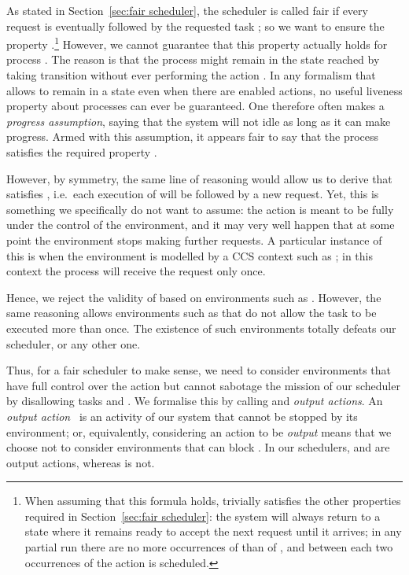 \documentclass[smallcondensed]{svjour3}
\newcommand{\Sect}[1]{Section~\ref{sec:#1}}
\newcounter {part}
\begin{document}
As stated in Section~\ref{sec:fair scheduler}, the scheduler is called fair if 
every request  is eventually followed by the requested task ; so we 
want to ensure the property
.\footnote{When assuming that this formula holds,
   trivially satisfies the other properties required in \Sect{fair scheduler}:
the system will always return to a state where it remains ready to
accept the next request  until it arrives; in any partial run there are no more
occurrences of  than of , and between each two occurrences of
 the action  is scheduled.}
However, we cannot guarantee that this property actually holds for process .
The reason is that the process might remain in the state  
reached by taking transition  without ever performing the 
action . In any formalism that allows to remain in a state
even when there are enabled actions, no useful liveness property about
processes can ever be guaranteed. One therefore often makes a \emph{progress assumption},
saying that the system will not idle as long as it can make progress.
Armed with this assumption, it appears fair to say that the process  satisfies the required
property .

However, by symmetry, the same line of reasoning would allow us to derive that  satisfies
, i.e.\ each execution of  will be followed by a new
request. Yet, this is something we specifically do not want to assume: the action  is meant to be
fully under the control of the environment, and it may very well happen that at some point the
environment stops making further requests. A particular instance of this is when the environment is modelled by
a CCS context such as ; in this context the process  will
receive the request  only once.

Hence, we reject the validity of  based on environments
such as .
However, the same reasoning allows environments such as 
that do not allow the task  to be executed more than once. The existence of such environments
totally defeats our scheduler, or any other one.

Thus, for a fair scheduler to make sense, we need to consider environments that have full control
over the action  but cannot sabotage the mission of our scheduler by disallowing
tasks  and . We formalise this by calling  and  \emph{output actions}.
An \emph{output action}~\cite[Section 9.1]{TR13} is
an activity of our system that cannot be stopped by its environment; or, equivalently, considering
an action  to be \emph{output} means that we choose not to consider environments that can block .
In our schedulers,  and  are output actions, whereas  is not.
\end{document}
